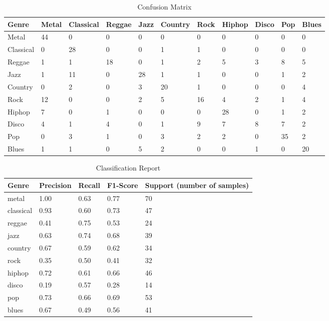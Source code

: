 \documentclass{article}
\begin{document}
    \begin{table}[h]
        \caption{Confusion Matrix}
        \centering
        \begin{tabular}{l | llllllllll}
            Genre & Metal & Classical & Reggae & Jazz & Country & Rock & Hiphop & Disco & Pop & Blues \\
            \midrule
            Metal & 44 & 0 & 0 & 0 & 0 & 0 & 0 & 0 & 0 & 0 \\
            Classical & 0 & 28 & 0 & 0 & 1 & 1 & 0 & 0 & 0 & 0 \\
            Reggae & 1 & 1 & 18 & 0 & 1 & 2 & 5 & 3 & 8 & 5 \\
            Jazz & 1 & 11 & 0 & 28 & 1 & 1 & 0 & 0 & 1 & 2 \\
            Country & 0 & 2 & 0 & 3 & 20 & 1 & 0 & 0 & 0 & 4 \\
            Rock & 12 & 0 & 0 & 2 & 5 & 16 & 4 & 2 & 1 & 4 \\
            Hiphop & 7 & 0 & 1 & 0 & 0 & 0 & 28 & 0 & 1 & 2 \\
            Disco & 4 & 1 & 4 & 0 & 1 & 9 & 7 & 8 & 7 & 2 \\
            Pop & 0 & 3 & 1 & 0 & 3 & 2 & 2 & 0 & 35 & 2 \\
            Blues & 1 & 1 & 0 & 5 & 2 & 0 & 0 & 1 & 0 & 20 \\
            \bottomrule
        \end{tabular}
    \end{table}

    \begin{table}[h]
        \caption{Classification Report}
        \centering
        \begin{tabular}{l | l l l l}
            Genre & Precision & Recall & F1-Score & Support (number of samples) \\
            \midrule
            metal & 1.00 & 0.63 & 0.77 & 70 \\
            classical & 0.93 & 0.60 & 0.73 & 47 \\
            reggae & 0.41 & 0.75 & 0.53 & 24 \\
            jazz & 0.63 & 0.74 & 0.68 & 39 \\
            country & 0.67 & 0.59 & 0.62 & 34 \\
            rock & 0.35 & 0.50 & 0.41 & 32 \\
            hiphop & 0.72 & 0.61 & 0.66 & 46 \\
            disco & 0.19 & 0.57 & 0.28 & 14 \\
            pop & 0.73 & 0.66 & 0.69 & 53 \\
            blues & 0.67 & 0.49 & 0.56 & 41 \\
            \bottomrule
        \end{tabular}
    \end{table}
\end{document}
